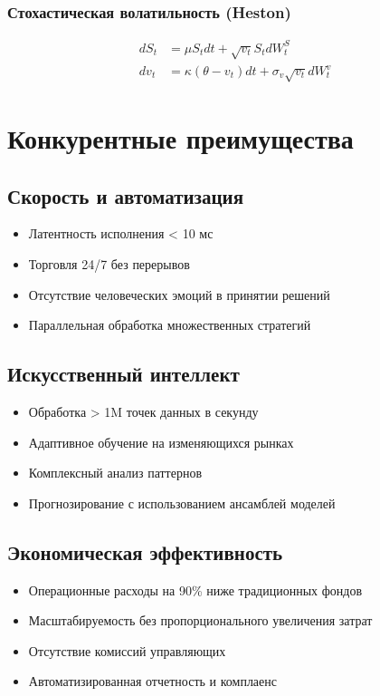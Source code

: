 \documentclass[12pt,a4paper]{article}
\begin{document}
\subsubsection{Стохастическая волатильность (Heston)}
\begin{align}
dS_t &= \mu S_t dt + \sqrt{v_t}S_t dW_t^S \\
dv_t &= \kappa(\theta - v_t)dt + \sigma_v\sqrt{v_t}dW_t^v
\end{align}

\section{Конкурентные преимущества}

\subsection{Скорость и автоматизация}
\begin{itemize}
    \item Латентность исполнения < 10 мс
    \item Торговля 24/7 без перерывов
    \item Отсутствие человеческих эмоций в принятии решений
    \item Параллельная обработка множественных стратегий
\end{itemize}

\subsection{Искусственный интеллект}
\begin{itemize}
    \item Обработка > 1M точек данных в секунду
    \item Адаптивное обучение на изменяющихся рынках
    \item Комплексный анализ паттернов
    \item Прогнозирование с использованием ансамблей моделей
\end{itemize}

\subsection{Экономическая эффективность}
\begin{itemize}
    \item Операционные расходы на 90\% ниже традиционных фондов
    \item Масштабируемость без пропорционального увеличения затрат
    \item Отсутствие комиссий управляющих
    \item Автоматизированная отчетность и комплаенс
\end{itemize}
\end{document}
